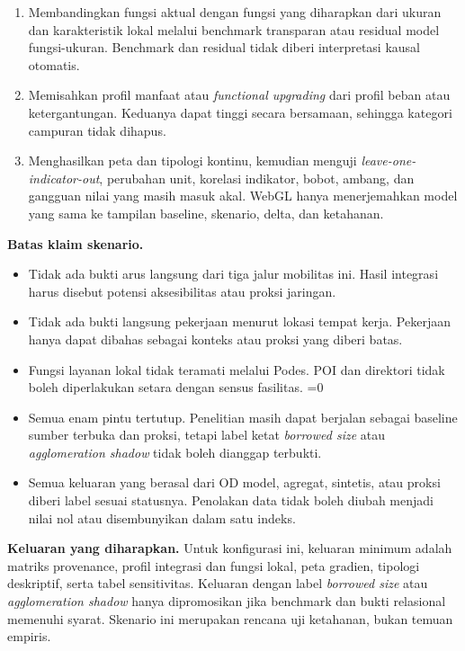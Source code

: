\documentclass[11pt]{article}
\newcounter{available}
\begin{document}
{{{{{{\begin{enumerate}
                \fi
              \fi
              \item Membandingkan fungsi aktual dengan fungsi yang diharapkan dari ukuran dan karakteristik lokal melalui benchmark transparan atau residual model fungsi-ukuran. Benchmark dan residual tidak diberi interpretasi kausal otomatis.
              \item Memisahkan profil manfaat atau \textit{functional upgrading} dari profil beban atau ketergantungan. Keduanya dapat tinggi secara bersamaan, sehingga kategori campuran tidak dihapus.
              \item Menghasilkan peta dan tipologi kontinu, kemudian menguji \textit{leave-one-indicator-out}, perubahan unit, korelasi indikator, bobot, ambang, dan gangguan nilai yang masih masuk akal. WebGL hanya menerjemahkan model yang sama ke tampilan baseline, skenario, delta, dan ketahanan.
            \end{enumerate}

            \textbf{Batas klaim skenario.}
            \begin{itemize}
              \ifnum{}
                \ifnum{}
                  \ifnum{}
                    \item Tidak ada bukti arus langsung dari tiga jalur mobilitas ini. Hasil integrasi harus disebut potensi aksesibilitas atau proksi jaringan.
                  \fi
                \fi
              \fi
              \ifnum{}
                \ifnum{}
                  \item Tidak ada bukti langsung pekerjaan menurut lokasi tempat kerja. Pekerjaan hanya dapat dibahas sebagai konteks atau proksi yang diberi batas.
                \fi
              \fi
              \ifnum{}
                \item Fungsi layanan lokal tidak teramati melalui Podes. POI dan direktori tidak boleh diperlakukan setara dengan sensus fasilitas.
              \fi
              \ifnum\value{available}=0
                \item Semua enam pintu tertutup. Penelitian masih dapat berjalan sebagai baseline sumber terbuka dan proksi, tetapi label ketat \textit{borrowed size} atau \textit{agglomeration shadow} tidak boleh dianggap terbukti.
              \fi
              \item Semua keluaran yang berasal dari OD model, agregat, sintetis, atau proksi diberi label sesuai statusnya. Penolakan data tidak boleh diubah menjadi nilai nol atau disembunyikan dalam satu indeks.
            \end{itemize}

            \textbf{Keluaran yang diharapkan.} Untuk konfigurasi ini, keluaran minimum adalah matriks provenance, profil integrasi dan fungsi lokal, peta gradien, tipologi deskriptif, serta tabel sensitivitas. Keluaran dengan label \textit{borrowed size} atau \textit{agglomeration shadow} hanya dipromosikan jika benchmark dan bukti relasional memenuhi syarat. Skenario ini merupakan rencana uji ketahanan, bukan temuan empiris.
          }
        }
      }
    }
  }
}
\end{document}
